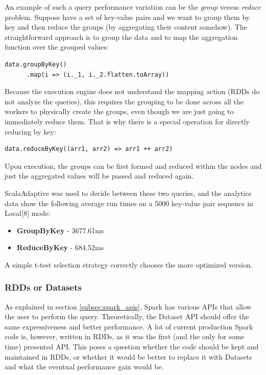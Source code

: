 An example of such a query performance variation can be the \textit{group} versus \textit{reduce} problem. Suppose have a set of key-value pairs and we want to group them by key and then reduce the groups (by aggregating their content somehow). The straightforward approach is to group the data and to map the aggregation function over the grouped values:

\lstset{style=Scala}
\begin{lstlisting}
data.groupByKey()
      .map(i => (i._1, i._2.flatten.toArray))
\end{lstlisting}

Because the execution engine does not understand the mapping action (RDDs do not analyze the queries), this requires the grouping to be done across all the workers to physically create the groups, even though we are just going to immediately reduce them. That is why there is a special operation for directly reducing by key:

\lstset{style=Scala}
\begin{lstlisting}
data.reduceByKey((arr1, arr2) => arr1 ++ arr2)
\end{lstlisting}

Upon execution, the groups can be first formed and reduced within the nodes and just the aggregated values will be passed and reduced again.

ScalaAdaptive was used to decide between these two queries, and the analytics data show the following average run times on a 5000 key-value pair sequence in Local[8] mode:
\begin{itemize}
	\item \textbf{GroupByKey} - 3677.61ms
	\item \textbf{ReduceByKey} - 684.52ms
\end{itemize}

A simple t-test selection strategy correctly chooses the more optimized version.

\subsubsection{RDDs or Datasets}

As explained in section \ref{subsec:spark_apis}, Spark has various APIs that allow the user to perform the query. Theoretically, the Dataset API should offer the same expressiveness and better performance. A lot of current production Spark code is, however, written in RDDs, as it was the first (and the only for some time) presented API. This poses a question whether the code should be kept and maintained in RDDs, or whether it would be better to replace it with Datasets and what the eventual performance gain would be.

